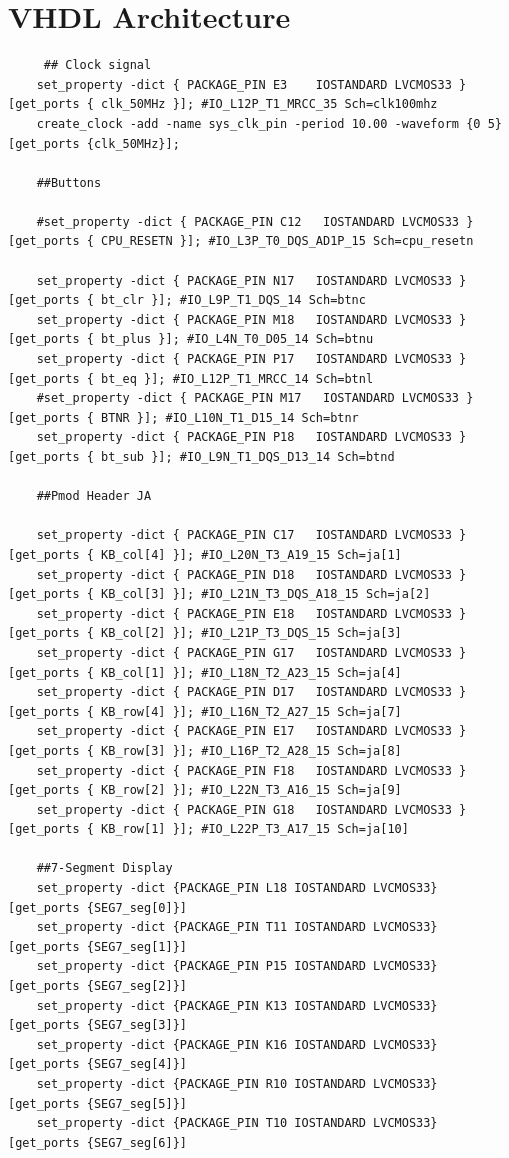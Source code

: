  \section{VHDL Architecture}
 \begin{verbatim}
     ## Clock signal
    set_property -dict { PACKAGE_PIN E3    IOSTANDARD LVCMOS33 } [get_ports { clk_50MHz }]; #IO_L12P_T1_MRCC_35 Sch=clk100mhz
    create_clock -add -name sys_clk_pin -period 10.00 -waveform {0 5} [get_ports {clk_50MHz}];

    ##Buttons

    #set_property -dict { PACKAGE_PIN C12   IOSTANDARD LVCMOS33 } [get_ports { CPU_RESETN }]; #IO_L3P_T0_DQS_AD1P_15 Sch=cpu_resetn

    set_property -dict { PACKAGE_PIN N17   IOSTANDARD LVCMOS33 } [get_ports { bt_clr }]; #IO_L9P_T1_DQS_14 Sch=btnc
    set_property -dict { PACKAGE_PIN M18   IOSTANDARD LVCMOS33 } [get_ports { bt_plus }]; #IO_L4N_T0_D05_14 Sch=btnu
    set_property -dict { PACKAGE_PIN P17   IOSTANDARD LVCMOS33 } [get_ports { bt_eq }]; #IO_L12P_T1_MRCC_14 Sch=btnl
    #set_property -dict { PACKAGE_PIN M17   IOSTANDARD LVCMOS33 } [get_ports { BTNR }]; #IO_L10N_T1_D15_14 Sch=btnr
    set_property -dict { PACKAGE_PIN P18   IOSTANDARD LVCMOS33 } [get_ports { bt_sub }]; #IO_L9N_T1_DQS_D13_14 Sch=btnd

    ##Pmod Header JA

    set_property -dict { PACKAGE_PIN C17   IOSTANDARD LVCMOS33 } [get_ports { KB_col[4] }]; #IO_L20N_T3_A19_15 Sch=ja[1]
    set_property -dict { PACKAGE_PIN D18   IOSTANDARD LVCMOS33 } [get_ports { KB_col[3] }]; #IO_L21N_T3_DQS_A18_15 Sch=ja[2]
    set_property -dict { PACKAGE_PIN E18   IOSTANDARD LVCMOS33 } [get_ports { KB_col[2] }]; #IO_L21P_T3_DQS_15 Sch=ja[3]
    set_property -dict { PACKAGE_PIN G17   IOSTANDARD LVCMOS33 } [get_ports { KB_col[1] }]; #IO_L18N_T2_A23_15 Sch=ja[4]
    set_property -dict { PACKAGE_PIN D17   IOSTANDARD LVCMOS33 } [get_ports { KB_row[4] }]; #IO_L16N_T2_A27_15 Sch=ja[7]
    set_property -dict { PACKAGE_PIN E17   IOSTANDARD LVCMOS33 } [get_ports { KB_row[3] }]; #IO_L16P_T2_A28_15 Sch=ja[8]
    set_property -dict { PACKAGE_PIN F18   IOSTANDARD LVCMOS33 } [get_ports { KB_row[2] }]; #IO_L22N_T3_A16_15 Sch=ja[9]
    set_property -dict { PACKAGE_PIN G18   IOSTANDARD LVCMOS33 } [get_ports { KB_row[1] }]; #IO_L22P_T3_A17_15 Sch=ja[10]

    ##7-Segment Display
    set_property -dict {PACKAGE_PIN L18 IOSTANDARD LVCMOS33} [get_ports {SEG7_seg[0]}]
    set_property -dict {PACKAGE_PIN T11 IOSTANDARD LVCMOS33} [get_ports {SEG7_seg[1]}]
    set_property -dict {PACKAGE_PIN P15 IOSTANDARD LVCMOS33} [get_ports {SEG7_seg[2]}]
    set_property -dict {PACKAGE_PIN K13 IOSTANDARD LVCMOS33} [get_ports {SEG7_seg[3]}]
    set_property -dict {PACKAGE_PIN K16 IOSTANDARD LVCMOS33} [get_ports {SEG7_seg[4]}]
    set_property -dict {PACKAGE_PIN R10 IOSTANDARD LVCMOS33} [get_ports {SEG7_seg[5]}]
    set_property -dict {PACKAGE_PIN T10 IOSTANDARD LVCMOS33} [get_ports {SEG7_seg[6]}]


\end{verbatim}
